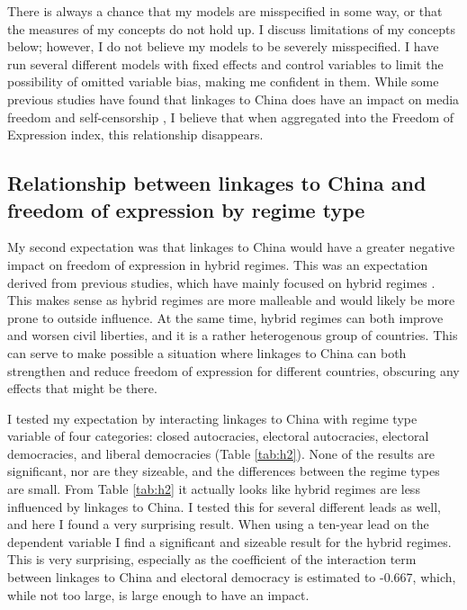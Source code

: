 There is always a chance that my models are misspecified in some way, or that the measures of my concepts do not hold up. I discuss limitations of my concepts below; however, I do not believe my models to be severely misspecified. I have run several different models with fixed effects and control variables to limit the possibility of omitted variable bias, making me confident in them. While some previous studies have found that linkages to China does have an impact on media freedom and self-censorship \citep{gamso_is_2021, toettoe_foreign_2023}, I believe that when aggregated into the Freedom of Expression index, this relationship disappears. 

\subsection{Relationship between linkages to China and freedom of expression by regime type}
My second expectation was that linkages to China would have a greater negative impact on freedom of expression in hybrid regimes. This was an expectation derived from previous studies, which have mainly focused on hybrid regimes \citep{tansey_ties_2017, toettoe_foreign_2023}. This makes sense as hybrid regimes are more malleable and would likely be more prone to outside influence. At the same time, hybrid regimes can both improve and worsen civil liberties, and it is a rather heterogenous group of countries. This can serve to make possible a situation where linkages to China can both strengthen and reduce freedom of expression for different countries, obscuring any effects that might be there.

I tested my expectation by interacting linkages to China with regime type variable of four categories: closed autocracies, electoral autocracies, electoral democracies, and liberal democracies (Table \ref{tab:h2}). None of the results are significant, nor are they sizeable, and the differences between the regime types are small. From Table \ref{tab:h2} it actually looks like hybrid regimes are less influenced by linkages to China. I tested this for several different leads as well, and here I found a very surprising result. When using a ten-year lead on the dependent variable I find a significant and sizeable result for the hybrid regimes. This is very surprising, especially as the coefficient of the interaction term between linkages to China and electoral democracy is estimated to -0.667, which, while not too large, is large enough to have an impact.

